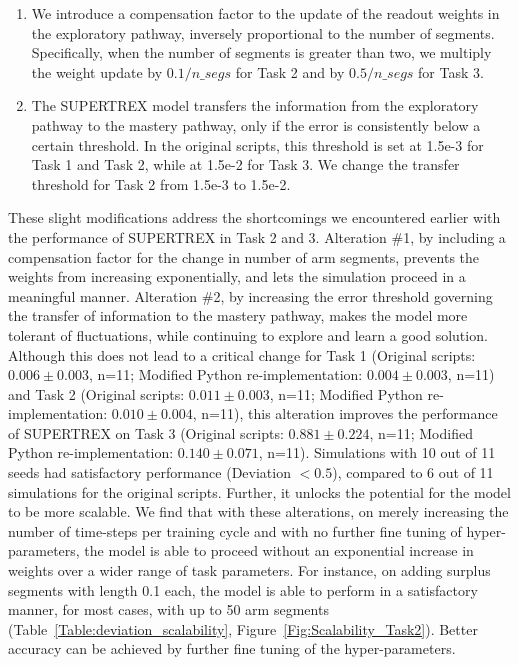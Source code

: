 \begin{enumerate}
    \item We introduce a compensation factor to the update of the readout weights in the exploratory pathway, inversely proportional to the number of segments. Specifically, when the number of segments is greater than two, we multiply the weight update by $0.1/n\_segs$ for Task 2 and by $0.5/n\_segs$ for Task 3.
    \item The SUPERTREX model transfers the information from the exploratory pathway to the mastery pathway, only if the error is consistently below a certain threshold. In the original scripts, this threshold is set at 1.5e-3 for Task 1 and Task 2, while at 1.5e-2 for Task 3. We change the transfer threshold for Task 2 from 1.5e-3 to 1.5e-2. 
\end{enumerate}

These slight modifications address the shortcomings we encountered earlier with the performance of SUPERTREX in Task 2 and 3. Alteration \#1, by including a compensation factor for the change in number of arm segments, prevents the weights from increasing exponentially, and lets the simulation proceed in a meaningful manner. Alteration \#2, by increasing the error threshold governing the transfer of information to the mastery pathway, makes the model more tolerant of fluctuations, while continuing to explore and learn a good solution. Although this does not lead to a critical change for Task 1 (Original scripts: $0.006\pm0.003$, n=11; Modified Python re-implementation: $0.004\pm0.003$, n=11) and Task 2 (Original scripts: $0.011\pm0.003$, n=11; Modified Python re-implementation: $0.010\pm0.004$, n=11), this alteration improves the performance of SUPERTREX on Task 3 (Original scripts: $0.881\pm0.224$, n=11; Modified Python re-implemen\-tation: $0.140\pm0.071$, n=11). Simulations with 10 out of 11 seeds had satisfactory performance (Deviation $< 0.5$), compared to 6 out of 11 simulations for the original scripts. Further, it unlocks the potential for the model to be more scalable. We find that with these alterations, on merely increasing the number of time-steps per training cycle and with no further fine tuning of hyper-parameters, the model is able to proceed without an exponential increase in weights over a wider range of task parameters. For instance, on adding surplus segments with length 0.1 each, the model is able to perform in a satisfactory manner, for most cases, with up to 50 arm segments (Table~\ref{Table:deviation_scalability}, Figure~\ref{Fig:Scalability_Task2}). Better accuracy can be achieved by further fine tuning of the hyper-parameters.






